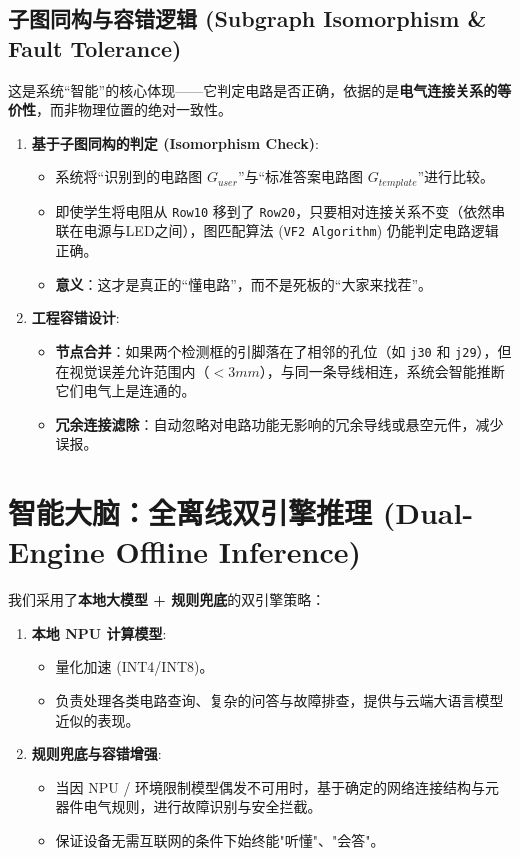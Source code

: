 \documentclass[a4paper,AutoFakeBold,oneside,12pt]{book}
\begin{document}
\subsection{子图同构与容错逻辑 (Subgraph Isomorphism \& Fault Tolerance)}
这是系统“智能”的核心体现——它判定电路是否正确，依据的是\textbf{电气连接关系的等价性}，而非物理位置的绝对一致性。

\begin{enumerate}
    \item \textbf{基于子图同构的判定 (Isomorphism Check)}:
    \begin{itemize}
        \item 系统将“识别到的电路图 $G_{user}$”与“标准答案电路图 $G_{template}$”进行比较。
        \item 即使学生将电阻从 \texttt{Row10} 移到了 \texttt{Row20}，只要相对连接关系不变（依然串联在电源与LED之间），图匹配算法 (\texttt{VF2 Algorithm}) 仍能判定电路逻辑正确。
        \item \textbf{意义}：这才是真正的“懂电路”，而不是死板的“大家来找茬”。
    \end{itemize}
    
    \item \textbf{工程容错设计}:
    \begin{itemize}
        \item \textbf{节点合并}：如果两个检测框的引脚落在了相邻的孔位（如 \texttt{j30} 和 \texttt{j29}），但在视觉误差允许范围内（$<3mm$），与同一条导线相连，系统会智能推断它们电气上是连通的。
        \item \textbf{冗余连接滤除}：自动忽略对电路功能无影响的冗余导线或悬空元件，减少误报。
    \end{itemize}
\end{enumerate}

\section{智能大脑：全离线双引擎推理 (Dual-Engine Offline Inference)}
我们采用了\textbf{本地大模型 + 规则兜底}的双引擎策略：

\begin{enumerate}
    \item \textbf{本地 NPU 计算模型}:
    \begin{itemize}
        \item 量化加速 (INT4/INT8)。
        \item 负责处理各类电路查询、复杂的问答与故障排查，提供与云端大语言模型近似的表现。
    \end{itemize}
    \item \textbf{规则兜底与容错增强}:
    \begin{itemize}
        \item 当因 NPU / 环境限制模型偶发不可用时，基于确定的网络连接结构与元器件电气规则，进行故障识别与安全拦截。
        \item 保证设备无需互联网的条件下始终能"听懂"、"会答"。
    \end{itemize}
\end{enumerate}
\end{document}
